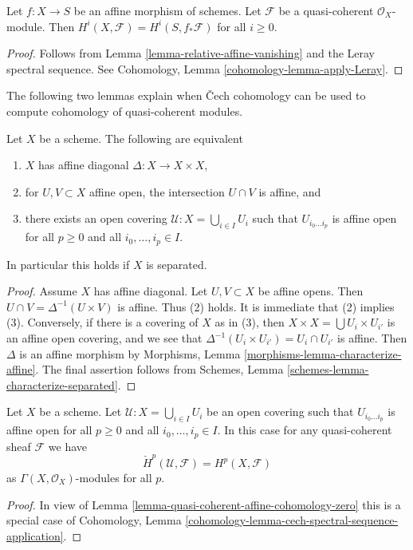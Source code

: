 \begin{lemma}
\label{lemma-relative-affine-cohomology}
Let $f : X \to S$ be an affine morphism of schemes.
Let $\mathcal{F}$ be a quasi-coherent $\mathcal{O}_X$-module.
Then $H^i(X, \mathcal{F}) = H^i(S, f_*\mathcal{F})$ for all $i \geq 0$.
\end{lemma}

\begin{proof}
Follows from Lemma \ref{lemma-relative-affine-vanishing}
and the Leray spectral sequence. See
Cohomology, Lemma \ref{cohomology-lemma-apply-Leray}.
\end{proof}

\noindent
The following two lemmas explain when {\v C}ech cohomology
can be used to compute cohomology of quasi-coherent modules.

\begin{lemma}
\label{lemma-affine-diagonal}
Let $X$ be a scheme. The following are equivalent
\begin{enumerate}
\item $X$ has affine diagonal $\Delta : X \to X \times X$,
\item for $U, V \subset X$ affine open, the intersection
$U \cap V$ is affine, and
\item there exists an open covering $\mathcal{U} : X = \bigcup_{i \in I} U_i$
such that $U_{i_0 \ldots i_p}$ is affine open for all $p \ge 0$ and all
$i_0, \ldots, i_p \in I$.
\end{enumerate}
In particular this holds if $X$ is separated.
\end{lemma}

\begin{proof}
Assume $X$ has affine diagonal. Let $U, V \subset X$ be affine opens.
Then $U \cap V = \Delta^{-1}(U \times V)$ is affine. Thus (2) holds.
It is immediate that (2) implies (3). Conversely, if there is a
covering of $X$ as in (3), then $X \times X = \bigcup U_i \times U_{i'}$
is an affine open covering, and we see that
$\Delta^{-1}(U_i \times U_{i'}) = U_i \cap U_{i'}$
is affine. Then $\Delta$ is an affine morphism by
Morphisms, Lemma \ref{morphisms-lemma-characterize-affine}.
The final assertion follows from Schemes, Lemma
\ref{schemes-lemma-characterize-separated}.
\end{proof}

\begin{lemma}
\label{lemma-cech-cohomology-quasi-coherent}
Let $X$ be a scheme.
Let $\mathcal{U} : X = \bigcup_{i \in I} U_i$ be an open covering such that
$U_{i_0 \ldots i_p}$ is affine open for all $p \ge 0$ and all
$i_0, \ldots, i_p \in I$.
In this case for any quasi-coherent sheaf $\mathcal{F}$ we have
$$
\check{H}^p(\mathcal{U}, \mathcal{F}) = H^p(X, \mathcal{F})
$$
as $\Gamma(X, \mathcal{O}_X)$-modules for all $p$.
\end{lemma}

\begin{proof}
In view of
Lemma \ref{lemma-quasi-coherent-affine-cohomology-zero}
this is a special case of
Cohomology, Lemma
\ref{cohomology-lemma-cech-spectral-sequence-application}.
\end{proof}







